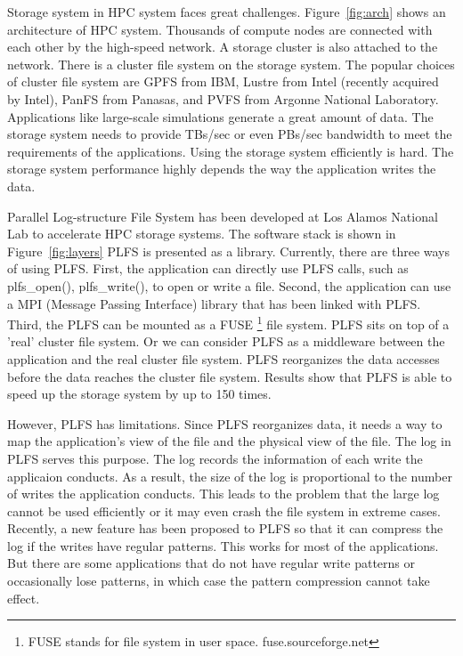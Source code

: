 \documentclass{acm_proc_article-sp}
\begin{document}
Storage system in HPC system faces great challenges.
Figure~\ref{fig:arch} shows an architecture of
HPC system. Thousands of compute nodes are connected
with each other by the high-speed network. A storage
cluster is also attached to the network. There is
a cluster file system on the storage system. The popular
choices of cluster file system are GPFS from IBM,
Lustre from Intel (recently acquired by Intel),
PanFS from Panasas, and PVFS from Argonne 
National Laboratory. Applications like large-scale
simulations generate a great amount of data. The storage
system needs to provide TBs/sec or even PBs/sec
bandwidth to meet the requirements of the applications.
Using the storage system efficiently is hard. The
storage system performance highly depends the way the
application writes the data.

Parallel Log-structure File System has been developed
at Los Alamos National Lab to accelerate HPC storage
systems. The software stack is shown in Figure~\ref{fig:layers}
PLFS is presented as a library. Currently, there
are three ways of using PLFS. First, the application
can directly use PLFS calls, such as plfs\_open(),
plfs\_write(), to open or write a file. 
Second, the application can use a MPI (Message Passing
Interface) library that has been linked with PLFS. 
Third, the PLFS can be mounted as a FUSE 
\footnote{FUSE stands for file system in user space. fuse.sourceforge.net}
file system.
PLFS sits on top of a 'real' cluster file system.
Or we can consider PLFS as a middleware between
the application and the real cluster file system.
PLFS reorganizes the data accesses before the
data reaches the cluster file system. 
Results show that PLFS is able to speed up
the storage system by up to 150 times. 

However, PLFS has limitations. Since PLFS reorganizes
data, it needs a way to map the application's view
of the file and the physical view of the file. 
The log in PLFS serves this purpose. The log
records the information of each write the applicaion
conducts. As a result, the size of the log
is proportional to the number of writes the
application conducts. This leads to the problem
that the large log cannot be used efficiently
or it may even crash the file system in extreme
cases. Recently, a new feature has been proposed
to PLFS so that it can compress the log if the 
writes have regular patterns. This works
for most of the applications. But there are
some applications that do not have regular 
write patterns or occasionally lose patterns,
in which case the pattern compression cannot
take effect. 
\end{document}
